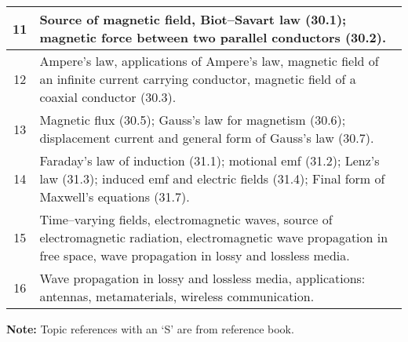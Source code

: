 \documentclass[12pt,a4paper]{article}
\begin{document}
\begin{center}
\begin{longtable}{|c|p{13cm}|}
		\hline
		11 \rule{0pt}{2.6ex} & Source of magnetic field, Biot--Savart law (30.1); magnetic force between two parallel conductors (30.2).\\
		\hline
		12 \rule{0pt}{2.6ex} & Ampere's law, applications of Ampere's law, magnetic field of an infinite current carrying conductor, magnetic field of a coaxial conductor (30.3).\\
		\hline
		13 \rule{0pt}{2.6ex} & Magnetic flux (30.5); Gauss's law for magnetism (30.6); displacement current and general form of Gauss's law (30.7).\\
		\hline
		14 \rule{0pt}{2.6ex} & Faraday's law of induction (31.1); motional emf (31.2); Lenz's law (31.3); induced emf and electric fields (31.4); Final form of Maxwell's equations (31.7).\\
		\hline
		15 \rule{0pt}{2.6ex} & Time--varying fields, electromagnetic waves, source of electromagnetic radiation, electromagnetic wave propagation in free space, wave propagation in lossy and lossless media.\\
		\hline
		16 \rule{0pt}{2.6ex} & Wave propagation in lossy and lossless media, applications: antennas, metamaterials, wireless communication.\\
	\hline \hline
	\end{longtable}
\end{center}
\noindent \textbf{Note:} Topic references with an `S' are from reference book.
\end{document}
